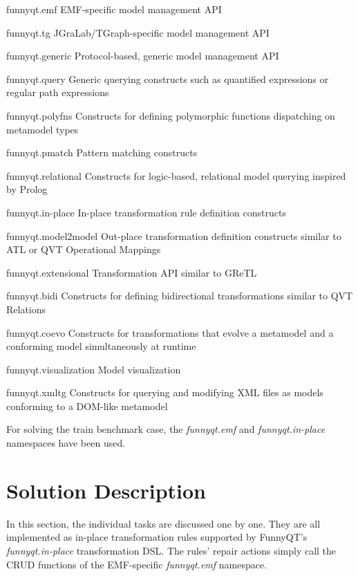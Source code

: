 \documentclass[submission]{eptcs}
\begin{document}
\begin{compactdesc}
\item[funnyqt.emf] EMF-specific model management API
\item[funnyqt.tg] JGraLab/TGraph-specific model management API
\item[funnyqt.generic] Protocol-based, generic model management API
\item[funnyqt.query] Generic querying constructs such as quantified expressions
  or regular path expressions
\item[funnyqt.polyfns] Constructs for defining polymorphic functions
  dispatching on metamodel types
\item[funnyqt.pmatch] Pattern matching constructs
\item[funnyqt.relational] Constructs for logic-based, relational model querying
  inspired by Prolog
\item[funnyqt.in-place] In-place transformation rule definition constructs
\item[funnyqt.model2model] Out-place transformation definition constructs
  similar to ATL or QVT Operational Mappings
\item[funnyqt.extensional] Transformation API similar to GReTL
\item[funnyqt.bidi] Constructs for defining bidirectional transformations
  similar to QVT Relations
\item[funnyqt.coevo] Constructs for transformations that evolve a metamodel and
  a conforming model simultaneously at runtime
\item[funnyqt.visualization] Model visualization
\item[funnyqt.xmltg] Constructs for querying and modifying XML files as models
  conforming to a DOM-like metamodel
\end{compactdesc}

For solving the train benchmark case, the \emph{funnyqt.emf} and
\emph{funnyqt.in-place} namespaces have been used.


\section{Solution Description}
\label{sec:solution-description}

In this section, the individual tasks are discussed one by one.  They are all
implemented as in-place transformation rules supported by FunnyQT's
\emph{funnyqt.in-place} transformation DSL.  The rules' repair actions simply
call the CRUD functions of the EMF-specific \emph{funnyqt.emf} namespace.
\end{document}
